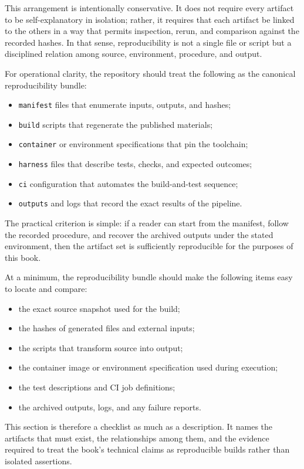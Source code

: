 \documentclass[11pt]{article}
\begin{document}
This arrangement is intentionally conservative. It does not require every artifact to be self-explanatory in isolation; rather, it requires that each artifact be linked to the others in a way that permits inspection, rerun, and comparison against the recorded hashes. In that sense, reproducibility is not a single file or script but a disciplined relation among source, environment, procedure, and output.

For operational clarity, the repository should treat the following as the canonical reproducibility bundle:
\begin{itemize}
  \item \texttt{manifest} files that enumerate inputs, outputs, and hashes;
  \item \texttt{build} scripts that regenerate the published materials;
  \item \texttt{container} or environment specifications that pin the toolchain;
  \item \texttt{harness} files that describe tests, checks, and expected outcomes;
  \item \texttt{ci} configuration that automates the build-and-test sequence;
  \item \texttt{outputs} and logs that record the exact results of the pipeline.
\end{itemize}

The practical criterion is simple: if a reader can start from the manifest, follow the recorded procedure, and recover the archived outputs under the stated environment, then the artifact set is sufficiently reproducible for the purposes of this book.

At a minimum, the reproducibility bundle should make the following items easy to locate and compare:
\begin{itemize}
  \item the exact source snapshot used for the build;
  \item the hashes of generated files and external inputs;
  \item the scripts that transform source into output;
  \item the container image or environment specification used during execution;
  \item the test descriptions and CI job definitions;
  \item the archived outputs, logs, and any failure reports.
\end{itemize}

This section is therefore a checklist as much as a description. It names the artifacts that must exist, the relationships among them, and the evidence required to treat the book's technical claims as reproducible builds rather than isolated assertions.
\end{document}

